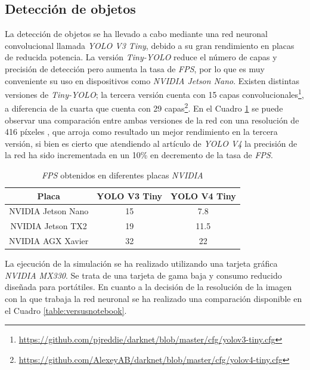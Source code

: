 \subsection{Detección de objetos}
\label{subsection:objectdetector}
La detección de objetos se ha llevado a cabo mediante una red neuronal convolucional llamada \textit{YOLO V3 Tiny}, debido a su gran rendimiento en placas de reducida potencia. La versión \textit{Tiny-YOLO} reduce el número de capas y precisión de detección pero aumenta la tasa de \textit{FPS}, por lo que es muy conveniente su uso en dispositivos como \textit{NVIDIA Jetson Nano}. Existen distintas versiones de \textit{Tiny-YOLO}; la tercera versión cuenta con 15 capas convolucionales\footnote{\url{https://github.com/pjreddie/darknet/blob/master/cfg/yolov3-tiny.cfg}}, a diferencia de la cuarta que cuenta con 29 capas\footnote{\url{https://github.com/AlexeyAB/darknet/blob/master/cfg/yolov4-tiny.cfg}}. En el Cuadro \ref{table:v3vsv4} se puede observar una comparación entre ambas versiones de la red con una resolución de 416 píxeles \cite{versus}, que arroja como resultado un mejor rendimiento en la tercera versión, si bien es cierto que atendiendo al artículo de \textit{YOLO V4} \cite{yolov4} la precisión de la red ha sido incrementada en un 10\% en decremento de la tasa de \textit{FPS}.\\

\begin{table}[H]
	\begin{center}
		\begin{tabular}{|c|c|c|}
			\hline
			\textbf{Placa}     & \textbf{YOLO V3 Tiny} & \textbf{YOLO V4 Tiny}
			\\
			\hline
			NVIDIA Jetson Nano & 15                    & 7.8
			\\
			NVIDIA Jetson TX2  & 19                    & 11.5
			\\
			NVIDIA AGX Xavier  & 32                    & 22
			\\
			\hline
		\end{tabular}
		\caption{\textit{FPS} obtenidos en diferentes placas \textit{NVIDIA}}
		\label{table:v3vsv4}
	\end{center}
\end{table}

La ejecución de la simulación se ha realizado utilizando una tarjeta gráfica \textit{NVIDIA MX330}. Se trata de una tarjeta de gama baja y consumo reducido diseñada para portátiles. En cuanto a la decisión de la resolución de la imagen con la que trabaja la red neuronal se ha realizado una comparación disponible en el Cuadro \ref{table:versusnotebook}.\\

